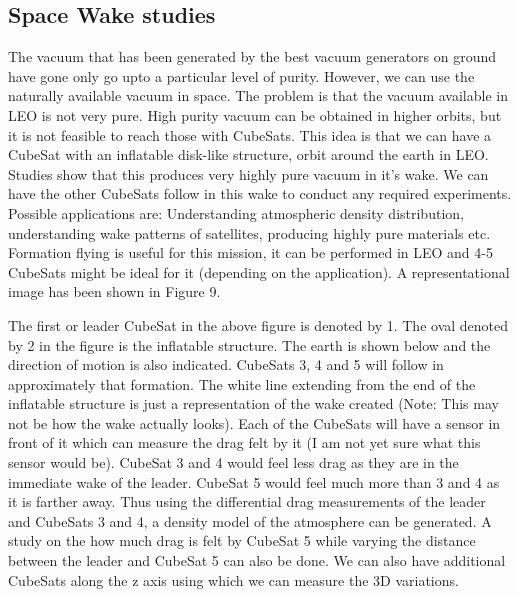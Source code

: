 \subsection{Space Wake studies}
\label{space_wake}
The vacuum that has been generated by the best vacuum generators on ground have gone only
go upto a particular level of purity. However, we can use the naturally available vacuum in
space. The problem is that the vacuum available in LEO is not very pure. High purity vacuum
can be obtained in higher orbits, but it is not feasible to reach those with CubeSats. This idea
is that we can have a CubeSat with an inflatable disk-like structure, orbit around the earth in
LEO. Studies show that this produces very highly pure vacuum in it's wake. We can have the
other CubeSats follow in this wake to conduct any required experiments. Possible applications
are: Understanding atmospheric density distribution, understanding wake patterns of satellites,
producing highly pure materials etc. Formation flying is useful for this mission, it can be
performed in LEO and 4-5 CubeSats might be ideal for it (depending on the application). A
representational image has been shown in Figure 9. 

The first or leader CubeSat in the above figure is denoted by 1. The oval denoted by 2 in
the figure is the inflatable structure. The earth is shown below and the direction of motion is
also indicated. CubeSats 3, 4 and 5 will follow in approximately that formation. The white line
extending from the end of the inflatable structure is just a representation of the wake created
(Note: This may not be how the wake actually looks). Each of the CubeSats will have a sensor
in front of it which can measure the drag felt by it (I am not yet sure what this sensor would
be). CubeSat 3 and 4 would feel less drag as they are in the immediate wake of the leader.
CubeSat 5 would feel much more than 3 and 4 as it is farther away. Thus using the differential
drag measurements of the leader and CubeSats 3 and 4, a density model of the atmosphere can
be generated. A study on the how much drag is felt by CubeSat 5 while varying the distance between the leader and CubeSat 5 can also be done. We can also have additional CubeSats along the z axis using which we can measure the 3D variations.

